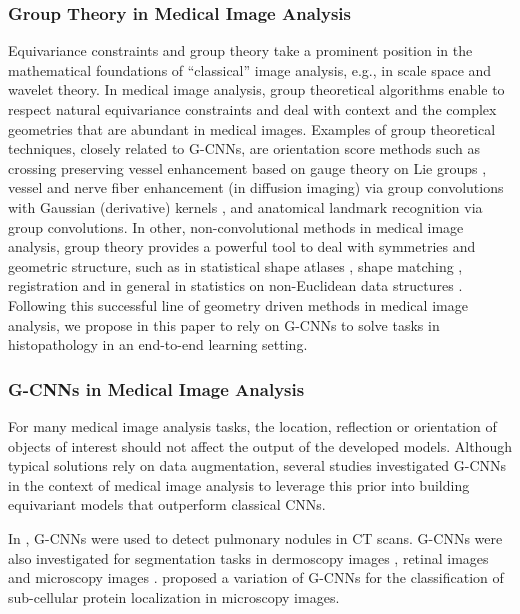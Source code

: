 \documentclass[twocolumn,final]{article}
\begin{document}
\subsubsection{Group Theory in Medical Image Analysis}
Equivariance constraints and group theory take a prominent position in the mathematical foundations of “classical” image analysis, e.g., in scale space and wavelet theory. In medical image analysis, group theoretical algorithms enable to respect natural equivariance constraints and deal with context and the complex geometries that are abundant in medical images.
Examples of group theoretical techniques, closely related to G-CNNs, are orientation score \citep{duits_image_2007,janssen_design_2018} methods such as crossing preserving vessel enhancement based on gauge theory on Lie groups \citep{franken_crossing-preserving_2009,hannink_crossing-preserving_2014,duits_locally_2016}, vessel and nerve fiber enhancement (in diffusion imaging) via group convolutions with Gaussian (derivative) kernels \citep{duits_left-invariant_2011,zhang_robust_2015,portegies_improving_2015}, and anatomical landmark recognition via group convolutions\citep{bekkers_b-spline_2019}. In other, non-convolutional methods in medical image analysis, group theory provides a powerful tool to deal with symmetries and geometric structure, such as in statistical shape atlases \citep{hefny_liver_2015}, shape matching \citep{hou_computing_2018}, registration \citep{arsigny_log-euclidean_2006,ashburner_fast_2007} and in general in statistics on non-Euclidean data structures \citep{pennec_riemannian_2019}. Following this successful line of geometry driven methods in medical image analysis, we propose in this paper to rely on G-CNNs to solve tasks in histopathology in an end-to-end learning setting. 


\subsubsection{G-CNNs in Medical Image Analysis}
\label{sec:GCNNsInMedIA}
For many medical image analysis tasks, the location, reflection or orientation of objects of interest should not affect the output of the developed models.
Although typical solutions rely on data augmentation, several studies investigated G-CNNs in the context of medical image analysis to leverage this prior into building equivariant models that outperform classical CNNs.

In \citet{winkels2018nodule, winkels2019nodule, andrearczyk2019pulmonary}, G-CNNs were used to detect pulmonary nodules in CT scans.
G-CNNs were also investigated for segmentation tasks in dermoscopy images \citep{li2018dermoscopy}, retinal images \citep{bekkers2018roto} and microscopy images \citep{bekkers2018roto, chidester2019nuclear, graham2019rota}.
\citet{chidester2019microscopy} proposed a variation of G-CNNs for the classification of  sub-cellular protein localization in microscopy images.
\end{document}
